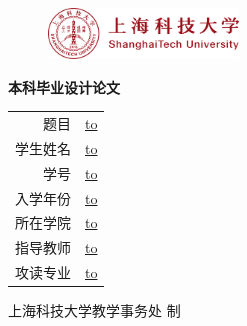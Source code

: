 \thispagestyle{empty}

\begin{figure}[!htb]
\includegraphics[width=0.45\textwidth]{style-files/emblem.pdf}
\end{figure}

\vspace{3cm}
\begin{center}
\Huge\sffamily\textbf{本科毕业设计论文}
\end{center}
\vfill

\vspace{3cm}
\begin{center}
{\def\arraystretch{1.5}
\makeatletter
  \begin{tabular}{Mc}
  题目 &
  \underline{\hbox to \@metaBlankLen{\hfill\@titleZh\hfill}} \\
  学生姓名 &
  \underline{\hbox to \@metaBlankLen{\hfill\@studentNameZh\hfill}} \\
  学号 &
  \underline{\hbox to \@metaBlankLen{\hfill\@studentId\hfill}} \\
  入学年份 &
  \underline{\hbox to } \\
  所在学院 &
  \underline{\hbox to \@metaBlankLen{\hfill\@departmentNameZh\hfill}} \\
  指导教师 &
  \underline{\hbox to \@metaBlankLen{\hfill\@advisorNameZh\hfill}} \\
  攻读专业 &
  \underline{\hbox to \@metaBlankLen{\hfill\@majorNameZh\hfill}} \\
\end{tabular}
\makeatother}
\end{center}

\vfill

\begin{center}
上海科技大学教学事务处 制\\
\zhtoday
\end{center}

\clearpage